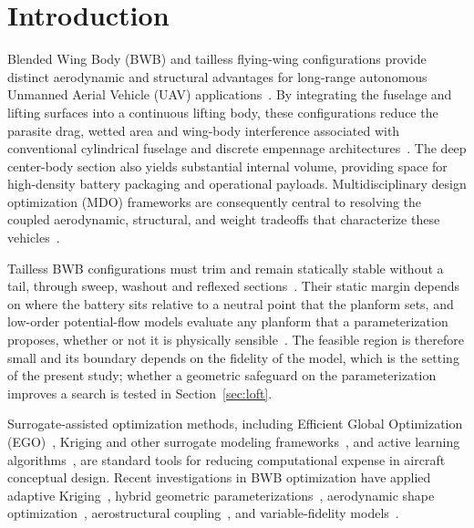 \section{Introduction}
\label{sec:introduction}

Blended Wing Body (BWB) and tailless flying-wing configurations provide distinct aerodynamic and structural advantages for long-range autonomous Unmanned Aerial Vehicle (UAV) applications~\cite{liebeck2004design,qin2004aerodynamic,okonkwo2016review}. By integrating the fuselage and lifting surfaces into a continuous lifting body, these configurations reduce the parasite drag, wetted area and wing-body interference associated with conventional cylindrical fuselage and discrete empennage architectures~\cite{kroo2001innovative,torenbeek2013advanced}. The deep center-body section also yields substantial internal volume, providing space for high-density battery packaging and operational payloads. Multidisciplinary design optimization (MDO) frameworks are consequently central to resolving the coupled aerodynamic, structural, and weight tradeoffs that characterize these vehicles~\cite{martins2013multidisciplinary,kenway2014multipoint,brooks2018benchmark}.

Tailless BWB configurations must trim and remain statically stable without a tail, through sweep, washout and reflexed sections~\cite{nickel1994tailless,nelson1998flight}. Their static margin depends on where the battery sits relative to a neutral point that the planform sets, and low-order potential-flow models evaluate any planform that a parameterization proposes, whether or not it is physically sensible~\cite{katz2001low}. The feasible region is therefore small and its boundary depends on the fidelity of the model, which is the setting of the present study; whether a geometric safeguard on the parameterization improves a search is tested in Section~\ref{sec:loft}.

Surrogate-assisted optimization methods, including Efficient Global Optimization (EGO)~\cite{jones1998efficient}, Kriging and other surrogate modeling frameworks~\cite{forrester2008engineering,koziel2013variable,bouhlel2019python}, and active learning algorithms~\cite{settles2009active,shahriari2016human}, are standard tools for reducing computational expense in aircraft conceptual design. Recent investigations in BWB optimization have applied adaptive Kriging~\cite{suo2026kriging}, hybrid geometric parameterizations~\cite{wang2026hybrid}, aerodynamic shape optimization~\cite{lyu2014aerodynamic,reist2013aerodynamic}, aerostructural coupling~\cite{jasa2018openaerostruct}, and variable-fidelity models~\cite{koziel2013variable,koziel2013surrogate}.

